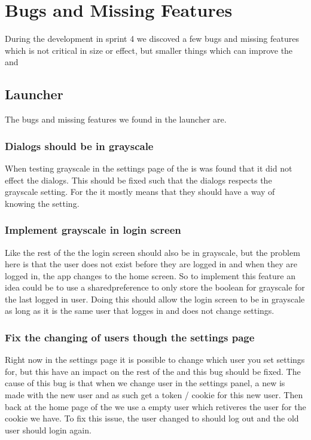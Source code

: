 \section{Bugs and Missing Features}
During the development in sprint 4 we discoved a few bugs and missing features
which is not critical in size or effect, but smaller things which can improve the  and

\subsection{Launcher}
The bugs and missing features we found in the launcher are.

\subsubsection{Dialogs should be in grayscale}
When testing grayscale in the settings page of the  is was found that it
did not effect the dialogs. This should be fixed such that the dialogs respects
the grayscale setting. For the  it mostly means that they should have a
way of knowing the setting.

\subsubsection{Implement grayscale in login screen}
Like the rest of the  the login screen should also be in
grayscale, but the problem here is that the user does not exist before they are
logged in and when they are logged in, the app changes to the home screen. So to
implement this feature an idea could be to use a sharedpreference to only store
the boolean for grayscale for the last logged in user. Doing this should allow
the login screen to be in grayscale as long as it is the same user that logges
in and does not change settings.

\subsubsection{Fix the changing of users though the settings page}
Right now in the settings page it is possible to change which user you set
settings for, but this have an impact on the rest of the  and
this bug should be fixed. The cause of this bug is that when we change user in
the settings panel, a new  is made with the new user and as
such get a token / cookie for this new user. Then back at the home page of the
 we use a empty user  which retiveres the user
for the cookie we have. To fix this issue, the user changed to should log out
and the old user should login again.

